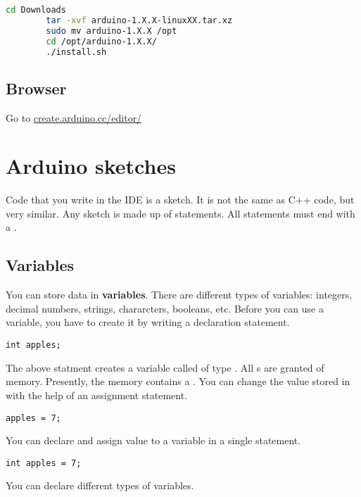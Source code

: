 \documentclass{article}
\begin{document}
		\begin{lstlisting}[language=bash]
		cd Downloads
		tar -xvf arduino-1.X.X-linuxXX.tar.xz
		sudo mv arduino-1.X.X /opt
		cd /opt/arduino-1.X.X/
		./install.sh
		\end{lstlisting}

	\subsection{Browser}
		Go to \url{create.arduino.cc/editor/}

\section{Arduino sketches}
	Code that you write in the IDE is a sketch. It is not the same as C++ code, but very similar. Any sketch is made up of statements. All statements must end with a \inlncd{;}.

	\subsection{Variables}

		You can store data in \textbf{variables}. There are different types of variables: integers, decimal numbers, strings, chararcters, booleans, etc. Before you can use a variable, you have to create it by writing a declaration statement.

		\begin{lstlisting}[caption={Declaration}, label=declaration]
		int apples;
		\end{lstlisting}

		The above statment creates a variable called  of type . All s are granted  of memory. Presently, the memory contains a . You can change the value stored in  with the help of an assignment statement.

		\begin{lstlisting}[caption={Assignment}, label=assignment]
		apples = 7;
		\end{lstlisting}

		You can declare and assign value to a variable in a single statement.

		\begin{lstlisting}[caption={Assignment}, label=assignment]
		int apples = 7;
		\end{lstlisting}

		You can declare different types of variables.
\end{document}
